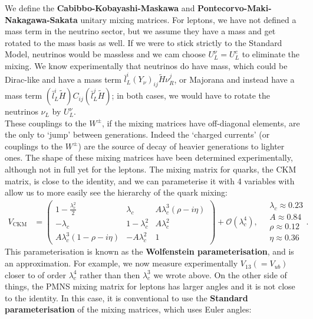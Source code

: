\documentclass[a4paper, 11pt, normalem]{report}
\begin{document}
We define the \textbf{Cabibbo-Kobayashi-Maskawa} and \textbf{Pontecorvo-Maki-Nakagawa-Sakata} unitary mixing matrices.
For leptons, we have not defined a mass term in the neutrino sector, but we assume they have a mass and get rotated to the mass basis as well.
If we were to stick strictly to the Standard Model, neutrinos would be massless and we cam choose $U_L^\nu=U_L^e$ to eliminate the mixing.
We know experimentally that neutrinos do have mass, which could be Dirac-like and have a mass term $\bar{l}_L^i(Y_\nu)_{ij}\tilde{H}\nu_R^j$, or Majorana and instead have a mass term $(\bar{l}_L^i\tilde{H})C_{ij}(\bar{l}_L^j\tilde{H})$; in both cases, we would have to rotate the neutrinos $\nu_L$ by $U_L^\nu$.\\
These couplings to the $W^\pm$, if the mixing matrices have off-diagonal elements, are the only to `jump' between generations.
Indeed the `charged currents' (or couplings to the $W^\pm$) are the source of decay of heavier generations to lighter ones.
The shape of these mixing matrices have been determined experimentally, although not in full yet for the leptons.
The mixing matrix for quarks, the CKM matrix, is close to the identity, and we can parameterise it with 4 variables with allow us to more easily see the hierarchy of the quark mixing:
\begin{align}
    V_{\text{CKM}} &= \begin{pmatrix} 1 - \frac{\lambda_c^2}{2} & \lambda_c & A\lambda_c^3(\rho-i\eta) \\ -\lambda_c & 1-\lambda_c^2 & A\lambda_c^2 \\ A\lambda_c^3(1-\rho-i\eta) & -A\lambda_c^2 & 1 \end{pmatrix} + \mathcal{O}(\lambda_c^4),\quad \begin{matrix} \lambda_c \approx 0.23 \\ A \approx 0.84 \\ \rho\approx0.12 \\ \eta\approx0.36\end{matrix}.
\end{align}
This parameterisation is known as the \textbf{Wolfenstein parameterisation}, and is an approximation.
For example, we now measure experimentally $V_{13}(=V_{ub})$ closer to of order $\lambda_c^4$ rather than then $\lambda_c^3$ we wrote above.
On the other side of things, the PMNS mixing matrix for leptons has larger angles and it is not close to the identity.
In this case, it is conventional to use the \textbf{Standard parameterisation} of the mixing matrices, which uses Euler angles:
\end{document}
